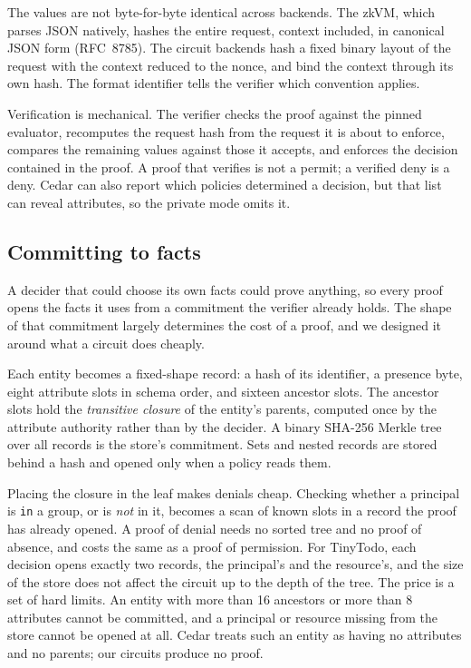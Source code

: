 \documentclass[11pt]{article}
\begin{document}
The values are not byte-for-byte identical across backends. The zkVM, which parses JSON natively, hashes the entire request, context included, in canonical JSON form (RFC~8785). The circuit backends hash a fixed binary layout of the request with the context reduced to the nonce, and bind the context through its own hash. The format identifier tells the verifier which convention applies.

Verification is mechanical. The verifier checks the proof against the pinned evaluator, recomputes the request hash from the request it is about to enforce, compares the remaining values against those it accepts, and enforces the decision contained in the proof. A proof that verifies is not a permit; a verified deny is a deny. Cedar can also report which policies determined a decision, but that list can reveal attributes, so the private mode omits it.


\subsection{Committing to facts}
\label{sec:records}

A decider that could choose its own facts could prove anything, so every proof opens the facts it uses from a commitment the verifier already holds. The shape of that commitment largely determines the cost of a proof, and we designed it around what a circuit does cheaply.

Each entity becomes a fixed-shape record: a hash of its identifier, a presence byte, eight attribute slots in schema order, and sixteen ancestor slots. The ancestor slots hold the \emph{transitive closure} of the entity's parents, computed once by the attribute authority rather than by the decider. A binary SHA-256 Merkle tree over all records is the store's commitment. Sets and nested records are stored behind a hash and opened only when a policy reads them.

Placing the closure in the leaf makes denials cheap. Checking whether a principal is \texttt{in} a group, or is \emph{not} in it, becomes a scan of known slots in a record the proof has already opened. A proof of denial needs no sorted tree and no proof of absence, and costs the same as a proof of permission. For TinyTodo, each decision opens exactly two records, the principal's and the resource's, and the size of the store does not affect the circuit up to the depth of the tree. The price is a set of hard limits. An entity with more than 16 ancestors or more than 8 attributes cannot be committed, and a principal or resource missing from the store cannot be opened at all. Cedar treats such an entity as having no attributes and no parents; our circuits produce no proof.
\end{document}
